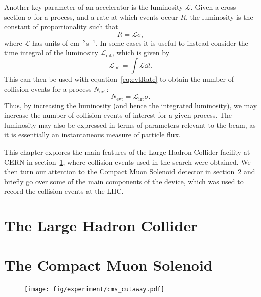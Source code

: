 Another key parameter of an accelerator is the luminosity $\mathcal{L}$.
Given a cross-section $\sigma$ for a process, and a rate at which events occur $R$, the luminosity is the constant of proportionality such that
\begin{equation}\label{eq:evtRate}
  R=\mathcal{L}\sigma,
\end{equation}
where $\mathcal{L}$ has units of cm$^{-2}$s$^{-1}$. %
In some cases it is useful to instead consider the time integral of the luminosity $\mathcal{L}_\mathrm{int}$, which is given by
\begin{equation}
  \mathcal{L}_\mathrm{int}=\int\mathcal{L}\dd{t}.
\end{equation}
This can then be used with equation~\ref{eq:evtRate} to obtain the number of collision events for a process $N_\mathrm{evt}$:
\begin{equation}
  N_\mathrm{evt}=\mathcal{L}_\mathrm{int}\sigma.
\end{equation}
Thus, by increasing the luminosity (and hence the integrated luminosity), we may increase the number of collision events of interest for a given process.
The luminosity may also be expressed in terms of parameters relevant to the beam, as it is essentially an instantaneous measure of particle flux. %



This chapter explores the main features of the Large Hadron Collider facility at CERN in section~\ref{sec:LHC}, where collision events used in the search were obtained.
We then turn our attention to the Compact Muon Solenoid detector in section~\ref{sec:CMS} and briefly go over some of the main components of the device, which was used to record the collision events at the LHC.

\section{The Large Hadron Collider} %
\label{sec:LHC}

\section{The Compact Muon Solenoid} %
\label{sec:CMS}

\begin{figure}[htbp] %
  \centering
  \texttt{[image: fig/experiment/cms\_cutaway.pdf]}
  \caption{}
  \label{fig:CMSCut}
\end{figure}

